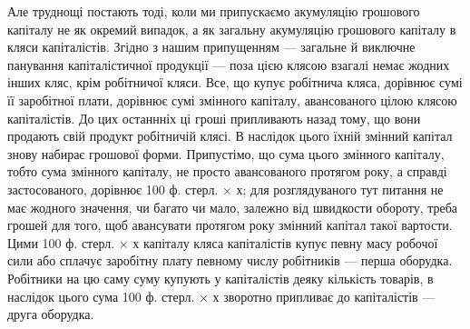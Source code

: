 Але труднощі постають тоді, коли ми припускаємо акумуляцію грошового
капіталу не як окремий випадок, а як загальну акумуляцію грошового
капіталу в кляси капіталістів. Згідно з нашим припущенням —
загальне й виключне панування капіталістичної продукції — поза цією
клясою взагалі немає жодних інших кляс, крім робітничої кляси. Все,
що купує робітнича кляса, дорівнює сумі її заробітної плати, дорівнює
сумі змінного капіталу, авансованого цілою клясою капіталістів. До цих
останнніх ці гроші припливають назад тому, що вони продають свій
продукт робітничій клясі. В наслідок цього їхній змінний капітал знову
набирає грошової форми. Припустімо, що сума цього змінного капіталу,
тобто сума змінного капіталу, не просто авансованого протягом року, а
справді застосованого, дорівнює 100 ф. стерл. × х; для розглядуваного тут
питання не має жодного значення, чи багато чи мало, залежно від швидкости
обороту, треба грошей для того, щоб авансувати протягом року
змінний капітал такої вартости. Цими 100 ф. стерл. × х капіталу кляса капіталістів
купує певну масу робочої сили або сплачує заробітну плату
певному числу робітників — перша оборудка. Робітники на цю саму суму
купують у капіталістів деяку кількість товарів, в наслідок цього сума
100 ф. стерл. × х зворотно припливає до капіталістів — друга оборудка.
\parbreak{}  %

